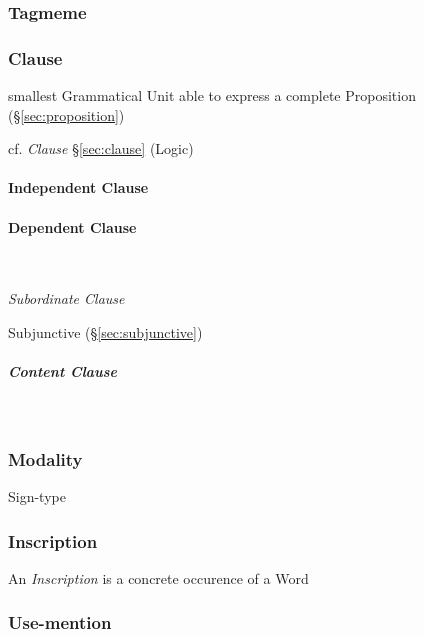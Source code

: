 \subsubsection{Tagmeme}\label{sec:tagmeme}

\subsubsection{Clause}\label{sec:grammatical_clause}

smallest Grammatical Unit able to express a complete Proposition
(\S\ref{sec:proposition})

cf. \emph{Clause} \S\ref{sec:clause} (Logic)



\paragraph{Independent Clause}\label{sec:independent_clause}\hfill

\paragraph{Dependent Clause}\label{sec:dependent_clause}\hfill \\\hfill

\emph{Subordinate Clause}

Subjunctive (\S\ref{sec:subjunctive})

\subparagraph{Content Clause}\label{sec:content_clause}\hfill \\\hfill



\subsubsection{Modality}\label{sec:syntax_modality}

Sign-type




\subsubsection{Inscription}\label{sec:inscription}

An \emph{Inscription} is a concrete occurence of a Word



\subsubsection{Use-mention}\label{sec:use_mention}

